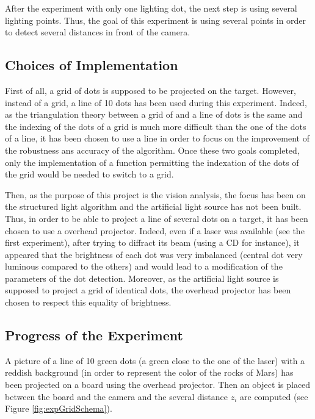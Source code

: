 After the experiment with only one lighting dot, the next step is using several lighting points. Thus, the goal of this experiment is using several points in order to detect several distances in front of the camera.

\subsection{Choices of Implementation}
First of all, a grid of dots is supposed to be projected on the target. However, instead of a grid, a line of 10 dots has been used during this experiment. Indeed, as the triangulation theory between a grid of and a line of dots is the same and the indexing of the dots of a grid is much more difficult than the one of the dots of a line, it has been chosen to use a line in order to focus on the improvement of the robustness ans accuracy of the algorithm. Once these two goals completed, only the implementation of a function permitting the indexation of the dots of the grid would be needed to switch to a grid.

Then, as the purpose of this project is the vision analysis, the focus has been on the structured light algorithm and the artificial light source has not been built. Thus, in order to be able to project a line of several dots on a target, it has been chosen to use a overhead projector. Indeed, even if a laser was available (see the first experiment), after trying to diffract its beam (using a CD for instance), it appeared that the brightness of each dot was very imbalanced (central dot very luminous compared to the others) and would lead to a modification of the parameters of the dot detection. Moreover, as the artificial light source is supposed to project a grid of identical dots, the overhead projector has been chosen to respect this equality of brightness.


\subsection{Progress of the Experiment}
A picture of a line of 10 green dots (a green close to the one of the laser) with a reddish background (in order to represent the color of the rocks of Mars) has been projected on a board using the overhead projector. Then an object is placed between the board and the camera and the several distance $z_i$ are computed (see Figure \ref{fig:expGridSchema}).


